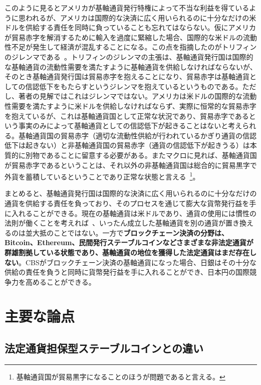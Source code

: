 \documentclass[dvipdfmx,a4paper]{jsarticle}
\begin{document}
このように見るとアメリカが基軸通貨発行特権によって不当な利益を得ているように思われるが、アメリカは国際的な決済に広く用いられるのに十分なだけの米ドルを供給する責任を同時に負っていることも忘れてはならない。仮にアメリカが貿易赤字を解消するために輸入を過度に緊縮した場合、国際的な米ドルの流動性不足が発生して経済が混乱することになる。この点を指摘したのがトリフィンのジレンマである~\cite{bordo2019triffin}。トリフィンのジレンマの主張は、基軸通貨発行国は国際的な基軸通貨の流動性需要を満たすように基軸通貨を供給しなければならないが、そのとき基軸通貨発行国は貿易赤字を抱えることになり、貿易赤字は基軸通貨としての信認低下をもたらすというジレンマを抱えているというものである。ただし、著者の見解ではこれはジレンマではない。アメリカは米ドルの国際的な流動性需要を満たすように米ドルを供給しなければならず、実際に恒常的な貿易赤字を抱えているが、これは基軸通貨国として正常な状況であり、貿易赤字であるという事実のみによって基軸通貨としての信認低下が起きることはないと考えられる。基軸通貨国の貿易赤字（適切な流動性供給が行われているかぎり通貨の信認低下は起きない）と非基軸通貨国の貿易赤字（通貨の信認低下が起きうる）は本質的に別物であることに留意する必要がある。またマクロに見れば、基軸通貨国が貿易赤字であるということは、それ以外の非基軸通貨国は総合的に貿易黒字で外貨を蓄積しているということであり正常な状態と言える~\footnote{基軸通貨国が貿易黒字になることのほうが問題であると言える。}。

まとめると、基軸通貨発行国は国際的な決済に広く用いられるのに十分なだけの通貨を供給する責任を負っており、そのプロセスを通じて膨大な貨幣発行益を手に入れることができる。現在の基軸通貨は米ドルであり、通貨の使用には慣性の法則が働くことを考えれば~\cite{goldberg2010international}、いったん成立した基軸通貨を別の通貨が置き換えるのは並大抵のことではない。一方で\textbf{ブロックチェーン決済の分野は、Bitcoin、Ethereum、民間発行ステーブルコインなどさまざまな非法定通貨が群雄割拠している状態であり、基軸通貨の地位を獲得した法定通貨はまだ存在しない}。CBSがブロックチェーン決済の基軸通貨になった場合、日銀はその十分な供給の責任を負うと同時に貨幣発行益を手に入れることができ、日本円の国際競争力を高めることができる。

\section{主要な論点}

\subsection{法定通貨担保型ステーブルコインとの違い}
\end{document}
